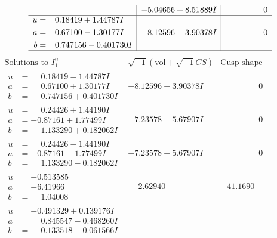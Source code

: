 \documentclass[1p]{elsarticle_modified}
\theoremstyle{definition}
\newcommand{\I}{\sqrt{-1}}
\begin{document}
$$\begin{array}{c|c|c}
 & -5.04656 + 8.51889 I & \phantom{-0.000000 } 0 \\ \hline\begin{aligned}
u &= \phantom{-}0.18419 + 1.44787 I \\
a &= \phantom{-}0.67100 - 1.30177 I \\
b &= \phantom{-}0.747156 - 0.401730 I\end{aligned}
 & -8.12596 + 3.90378 I & \phantom{-0.000000 } 0\\
 \hline 
 \end{array}$$\newpage$$\begin{array}{c|c|c}  
\text{Solutions to }I^u_{1}& \I (\text{vol} + \sqrt{-1}CS) & \text{Cusp shape}\\
 \hline 
\begin{aligned}
u &= \phantom{-}0.18419 - 1.44787 I \\
a &= \phantom{-}0.67100 + 1.30177 I \\
b &= \phantom{-}0.747156 + 0.401730 I\end{aligned}
 & -8.12596 - 3.90378 I & \phantom{-0.000000 } 0 \\ \hline\begin{aligned}
u &= \phantom{-}0.24426 + 1.44190 I \\
a &= -0.87161 + 1.77499 I \\
b &= \phantom{-}1.133290 + 0.182062 I\end{aligned}
 & -7.23578 + 5.67907 I & \phantom{-0.000000 } 0 \\ \hline\begin{aligned}
u &= \phantom{-}0.24426 - 1.44190 I \\
a &= -0.87161 - 1.77499 I \\
b &= \phantom{-}1.133290 - 0.182062 I\end{aligned}
 & -7.23578 - 5.67907 I & \phantom{-0.000000 } 0 \\ \hline\begin{aligned}
u &= -0.513585\phantom{ +0.000000I} \\
a &= -6.41966\phantom{ +0.000000I} \\
b &= \phantom{-}1.04008\phantom{ +0.000000I}\end{aligned}
 & \phantom{-}2.62940\phantom{ +0.000000I} & -41.1690\phantom{ +0.000000I} \\ \hline\begin{aligned}
u &= -0.491329 + 0.139176 I \\
a &= \phantom{-}0.845547 - 0.468260 I \\
b &= \phantom{-}0.133518 - 0.061566 I\end{aligned}

\end{array}$$
\end{document}
